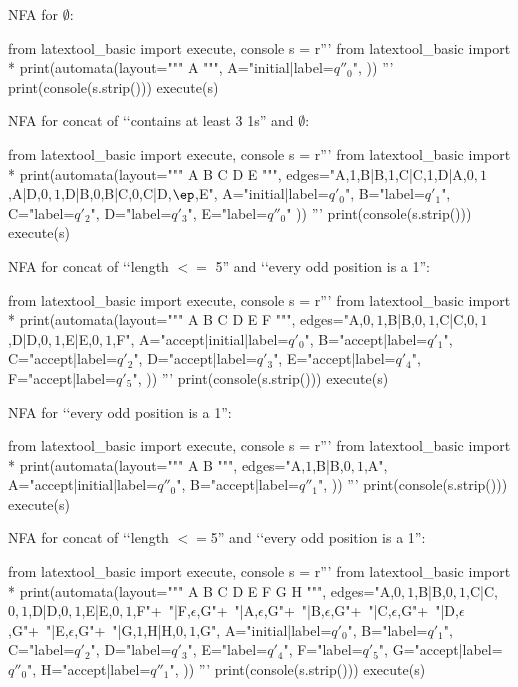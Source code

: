 NFA for $\emptyset$:
\begin{python}
from latextool_basic import execute, console
s = r'''
from latextool_basic import * 
print(automata(layout="""
A
""",
A="initial|label=$q''_0$",
))
'''
print(console(s.strip()))
execute(s)
\end{python}



NFA for concat of \lq\lq contains at least 3 1s'' and $\emptyset$:
\begin{python}
from latextool_basic import execute, console
s = r'''
from latextool_basic import * 
print(automata(layout="""
A B C D   E
""",
edges="A,1,B|B,1,C|C,1,D|A,$0,1$,A|D,$0,1$,D|B,0,B|C,0,C|D,$\ep$,E",
A="initial|label=$q'_0$",
B="label=$q'_1$",
C="label=$q'_2$",
D="label=$q'_3$",
E="label=$q''_0$"
))
'''
print(console(s.strip()))
execute(s)
\end{python}




NFA for concat of \lq\lq length $<=$ 5'' and 
\lq\lq every odd position is a 1'':
\begin{python}
from latextool_basic import execute, console
s = r'''
from latextool_basic import * 
print(automata(layout="""
A B C D E F
""",
edges="A,$0,1$,B|B,$0,1$,C|C,$0,1$,D|D,$0,1$,E|E,$0,1$,F",
A="accept|initial|label=$q'_0$",
B="accept|label=$q'_1$",
C="accept|label=$q'_2$",
D="accept|label=$q'_3$",
E="accept|label=$q'_4$",
F="accept|label=$q'_5$",              
))
'''
print(console(s.strip()))
execute(s)
\end{python}




NFA for \lq\lq every odd position is a 1'':
\begin{python}
from latextool_basic import execute, console
s = r'''
from latextool_basic import * 
print(automata(layout="""
A B
""",
edges="A,$1$,B|B,$0,1$,A",
A="accept|initial|label=$q''_0$",
B="accept|label=$q''_1$",
))
'''
print(console(s.strip()))
execute(s)
\end{python}




NFA for concat of \lq\lq length $<=$5'' and \lq\lq every odd position is a 1'':
\begin{python}
from latextool_basic import execute, console
s = r'''
from latextool_basic import * 
print(automata(layout="""
A B C D E F G H
""",
edges="A,$0,1$,B|B,$0,1$,C|C,$0,1$,D|D,$0,1$,E|E,$0,1$,F"+\
 "|F,$\epsilon$,G"+\
 "|A,$\epsilon$,G"+\
 "|B,$\epsilon$,G"+\
 "|C,$\epsilon$,G"+\
 "|D,$\epsilon$,G"+\
 "|E,$\epsilon$,G"+\
 "|G,$1$,H|H,$0,1$,G",
A="initial|label=$q'_0$",
B="label=$q'_1$",
C="label=$q'_2$",
D="label=$q'_3$",
E="label=$q'_4$",
F="label=$q'_5$",
G="accept|label=$q''_0$",
H="accept|label=$q''_1$",
))
'''
print(console(s.strip()))
execute(s)
\end{python}




